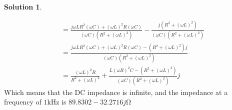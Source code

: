 \documentclass[10pt]{article}
\theoremstyle{definition}
\newtheorem{soln}{Solution}
\begin{document}
\begin{soln}
\begin{enumerate}[label=(\alph*)]
\begin{align*}
             & =\frac{j\omega LR^2\left(\omega C\right)+\left(\omega L\right)^2R\left(\omega C\right)}{\left(\omega C\right)\left(R^2+\left(\omega L\right)^2\right)}-\frac{j\left(R^2+\left(\omega L\right)^2\right)}{\left(\omega C\right)\left(R^2+\left(\omega L\right)^2\right)} \\
             & =\frac{j\omega LR^2\left(\omega C\right)+\left(\omega L\right)^2R\left(\omega C\right)-\left(R^2+\left(\omega L\right)^2\right)j}{\left(\omega C\right)\left(R^2+\left(\omega L\right)^2\right)}                                                                       \\
             & =\frac{\left(\omega L\right)^2R}{R^2+\left(\omega L\right)^2}+\frac{L\left(\omega R\right)^2C-\left(R^2+\left(\omega L\right)^2\right)}{\left(\omega C\right)\left(R^2+\left(\omega L\right)^2\right)}j
          \end{align*}
          Which means that the DC impedance is infinite, and the impedance at a frequency of $1\unit{\kilo\hertz}$ is $89.8302-32.2716j\unit\ohm$
  \end{enumerate}
\end{soln}
\end{document}
